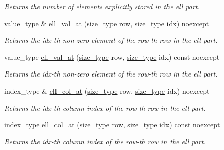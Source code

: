 \begin{DoxyCompactItemize}
\begin{DoxyCompactList}\small\item\em Returns the number of elements explicitly stored in the ell part. \end{DoxyCompactList}\item 
value\+\_\+type \& \hyperlink{classgko_1_1matrix_1_1Hybrid_a5a0b57a9285424720218ff03dad6846c}{ell\+\_\+val\+\_\+at} (\hyperlink{namespacegko_a6e5c95df0ae4e47aab2f604a22d98ee7}{size\+\_\+type} row, \hyperlink{namespacegko_a6e5c95df0ae4e47aab2f604a22d98ee7}{size\+\_\+type} idx) noexcept
\begin{DoxyCompactList}\small\item\em Returns the {\ttfamily idx}-\/th non-\/zero element of the {\ttfamily row}-\/th row in the ell part. \end{DoxyCompactList}\item 
value\+\_\+type \hyperlink{classgko_1_1matrix_1_1Hybrid_a3e0ab990e82db430d0e05fe165a11620}{ell\+\_\+val\+\_\+at} (\hyperlink{namespacegko_a6e5c95df0ae4e47aab2f604a22d98ee7}{size\+\_\+type} row, \hyperlink{namespacegko_a6e5c95df0ae4e47aab2f604a22d98ee7}{size\+\_\+type} idx) const noexcept
\begin{DoxyCompactList}\small\item\em Returns the {\ttfamily idx}-\/th non-\/zero element of the {\ttfamily row}-\/th row in the ell part. \end{DoxyCompactList}\item 
index\+\_\+type \& \hyperlink{classgko_1_1matrix_1_1Hybrid_ad41c68dbda50589378ad481c0ab8feea}{ell\+\_\+col\+\_\+at} (\hyperlink{namespacegko_a6e5c95df0ae4e47aab2f604a22d98ee7}{size\+\_\+type} row, \hyperlink{namespacegko_a6e5c95df0ae4e47aab2f604a22d98ee7}{size\+\_\+type} idx) noexcept
\begin{DoxyCompactList}\small\item\em Returns the {\ttfamily idx}-\/th column index of the {\ttfamily row}-\/th row in the ell part. \end{DoxyCompactList}\item 
index\+\_\+type \hyperlink{classgko_1_1matrix_1_1Hybrid_a3a2d9b00dd8b2333b05a97d968dfabff}{ell\+\_\+col\+\_\+at} (\hyperlink{namespacegko_a6e5c95df0ae4e47aab2f604a22d98ee7}{size\+\_\+type} row, \hyperlink{namespacegko_a6e5c95df0ae4e47aab2f604a22d98ee7}{size\+\_\+type} idx) const noexcept
\begin{DoxyCompactList}\small\item\em Returns the {\ttfamily idx}-\/th column index of the {\ttfamily row}-\/th row in the ell part. \end{DoxyCompactList}\item 

\end{DoxyCompactItemize}
